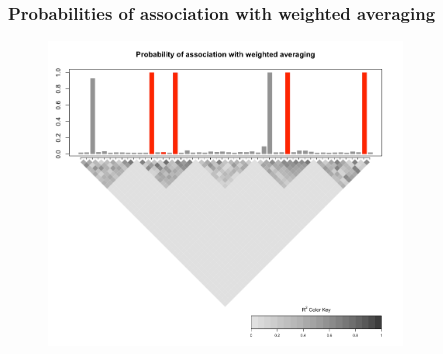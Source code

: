 \documentclass{beamer}
\begin{document}
\begin{frame}
\frametitle{Probabilities of association with weighted averaging}
\begin{figure}
\includegraphics[width=3.7in]{images/LD_blockCorr.png}
\end{figure}
\end{frame}
\end{document}

